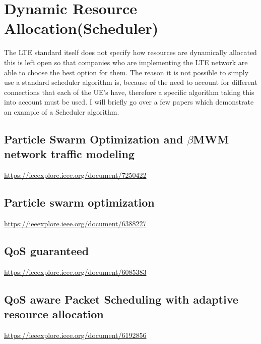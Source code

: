 \section{Dynamic Resource Allocation(Scheduler)}
{
	The LTE standard itself does not specify how resources are dynamically allocated this is left open so that companies who are implementing the LTE network are able to choose the best option for them. The reason it is not possible to simply use a standard scheduler algorithm is, because of the need to account for different connections that each of the UE's have, therefore a specific algorithm taking this into account must be used. I will briefly go over a few papers which demonstrate an example of a Scheduler algorithm.
	\subsection{Particle Swarm Optimization and $\beta$MWM network traffic modeling \cite{DRASwarmWthNetwork7250422}}
	{
		\url{https://ieeexplore.ieee.org/document/7250422}
	}

	\subsection{Particle swarm optimization \cite{DRASwarm6388227}}
	{
		\url{https://ieeexplore.ieee.org/document/6388227}
	}

	\subsection{QoS guaranteed \cite{DRAGuaranteedRA6085383}}
	{
		\url{https://ieeexplore.ieee.org/document/6085383}
	}
	
	\subsection{QoS aware Packet Scheduling with adaptive resource allocation \cite{DRAPacketScheduling6192856}}
	{
		\url{https://ieeexplore.ieee.org/document/6192856}
	}
}